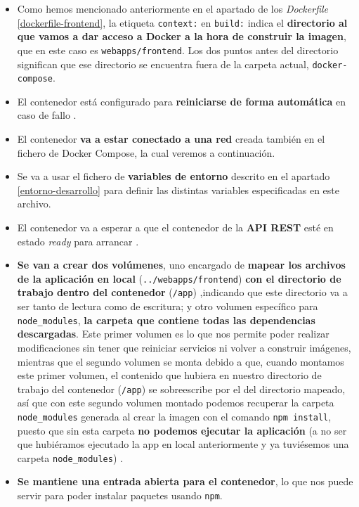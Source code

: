 \begin{itemize}
	\item Como hemos mencionado anteriormente en el apartado de los \textit{Dockerfile} \ref{dockerfile-frontend}, la etiqueta \verb,context:, en \verb,build:, indica el \textbf{directorio al que vamos a dar acceso a Docker a la hora de construir la imagen}, que en este caso es \verb,webapps/frontend,. Los dos puntos antes del directorio significan que ese directorio se encuentra fuera de la carpeta actual, \verb,docker-compose,.
	\item El contenedor está configurado para \textbf{reiniciarse de forma automática} en caso de fallo \cite{baeldung:restart-policies}.
	\item El contenedor \textbf{va a estar conectado a una red} creada también en el fichero de Docker Compose, la cual veremos a continuación.
	\item Se va a usar el fichero de \textbf{variables de entorno} descrito en el apartado \ref{entorno-desarrollo} para definir las distintas variables especificadas en este archivo.
	\item El contenedor va a esperar a que el contenedor de la \textbf{API REST} esté en estado \textit{ready} para arrancar \cite{docker:depends-on}.
	\item \textbf{Se van a crear dos volúmenes}, uno encargado de \textbf{mapear los archivos de la aplicación en local} (\verb,../webapps/frontend,) \textbf{con el directorio de trabajo dentro del contenedor} (\verb,/app,) ,indicando que este directorio va a ser tanto de lectura como de escritura; y otro volumen específico para \verb,node_modules,, \textbf{la carpeta que contiene todas las dependencias descargadas}. Este primer volumen es lo que nos permite poder realizar modificaciones sin tener que reiniciar servicios ni volver a construir imágenes, mientras que el segundo volumen se monta debido a que, cuando montamos este primer volumen, el contenido que hubiera en nuestro directorio de trabajo del contenedor (\verb,/app,) se sobreescribe por el del directorio mapeado, así que con este segundo volumen montado podemos recuperar la carpeta \verb,node_modules, generada al crear la imagen con el comando \verb,npm install,, puesto que sin esta carpeta \textbf{no podemos ejecutar la aplicación} (a no ser que hubiéramos ejecutado la app en local anteriormente y ya tuviésemos una carpeta \verb,node_modules,) \cite{stack-overflow:node_modules-folder}.
		\item \textbf{Se mantiene una entrada abierta para el contenedor}, lo que nos puede servir para poder instalar paquetes usando \verb,npm,.
\end{itemize}

